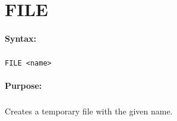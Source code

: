 
\newpage
\section{FILE}
\label{cmd:FILE}

\paragraph{Syntax:}
\subparagraph{}
\texttt{FILE <name>}

\paragraph{Purpose:}
\subparagraph{}
Creates a temporary file with the given name. 

